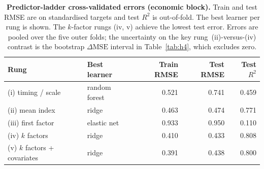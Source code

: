 \begin{table}[!tb]
\centering
\caption[Predictor-ladder cross-validated errors]{\textbf{Predictor-ladder cross-validated errors (economic block).} Train and test RMSE are on
standardised targets and test $R^2$ is out-of-fold. The best learner per rung is shown. The $k$-factor
rungs (iv, v) achieve the lowest test error. Errors are pooled over the five outer folds; the uncertainty
on the key rung~(ii)-versus-(iv) contrast is the bootstrap $\Delta\mathrm{MSE}$ interval in
Table~\ref{tab:h4}, which excludes zero.}
\label{tab:ladder}
\small
\begin{tabular}{@{}llrrr@{}}
\toprule
Rung & Best learner & Train RMSE & Test RMSE & Test $R^2$ \\
\midrule
(i) timing / scale & random forest & 0.521 & 0.741 & 0.459 \\
(ii) mean index & ridge & 0.463 & 0.474 & 0.771 \\
(iii) first factor & elastic net & 0.933 & 0.950 & 0.110 \\
(iv) $k$ factors & ridge & 0.410 & 0.433 & 0.808 \\
(v) $k$ factors + covariates & ridge & 0.391 & 0.438 & 0.800 \\
\bottomrule
\end{tabular}
\end{table}